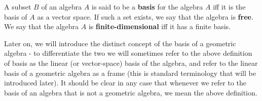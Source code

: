 \begin{definition}[Basis]\label{d:algebra-basis}
	A subset $B$ of an algebra $A$ is said to be a \textbf{basis} for the algebra $A$ iff it is the basis of $A$ as a vector space.
	If such a set exists, we say that the algebra is \textbf{free}. We say that the algebra $A$ is \textbf{finite-dimensional} iff it has a finite basis. 
\end{definition}
\begin{remark}
	Later on, we will introduce the distinct concept of the basis of a geometric algebra - to differentiate the two we will sometimes refer to the above definition of basis as the linear (or vector-space) basis of the algebra, and refer to the linear basis of a geometric algebra as a frame (this is standard terminology that will be introduced later). It should be clear in any case that whenever we refer to the basis of an algebra that is not a geometric algebra, we mean the above definition.
\end{remark}
